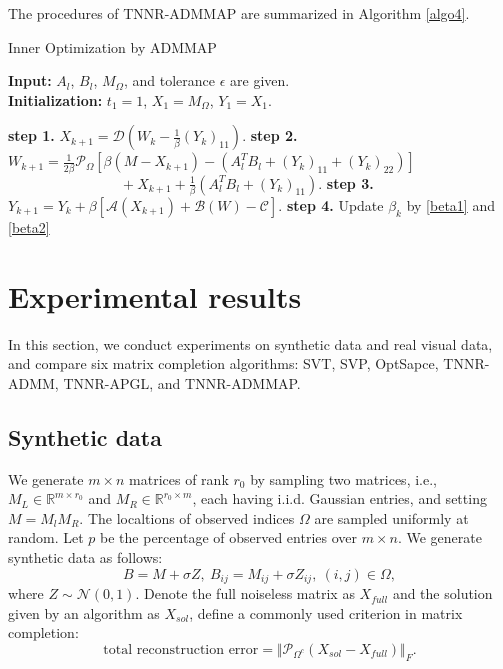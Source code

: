 \documentclass{article}
\begin{document}
{The procedures of TNNR-ADMMAP are summarized in Algorithm \ref{algo4}.

\begin{algorithm}[t]
	\caption{Inner Optimization by ADMMAP}
	\label{algo4}
	\textbf{Input:} $A_l$, $B_l$, $M_{\Omega}$, and tolerance $\epsilon$ are given.\\
	\textbf{Initialization:} $t_1 = 1$, $X_1 = M_{\Omega}$, $Y_1=X_1$.
	\begin{algorithmic}
		\Repeat 
		\State \textbf{step 1.} $X_{k+1} = \mathcal{D}\left(W_k - \frac{1}{\beta}(Y_k)_{11}\right)$.
		\State \textbf{step 2.} $W_{k+1} = \frac{1}{2\beta} \mathcal{P}_\Omega [\beta(M-X_{k+1}) - (A_l^TB_l + (Y_k)_{11}+ (Y_k)_{22})]$ \\
		$ \quad\quad\quad\quad\quad\quad\quad\quad+ X_{k+1} +  \frac{1}{\beta}(A_l^TB_l + (Y_k)_{11})$.
		\State \textbf{step 3.} $Y_{k+1} = Y_{k}+\beta[\mathcal{A}(X_{k+1})+\mathcal{B}(W)-\mathcal{C}]$.
		\State \textbf{step 4.} Update $\beta_k$ by \eqref{beta1} and \eqref{beta2}
	\end{algorithmic}
\end{algorithm}



\section{Experimental results}
\label{s4}

In this section, we conduct experiments on synthetic data and real visual data, and compare six matrix completion algorithms: SVT, SVP, OptSapce, TNNR-ADMM, TNNR-APGL, and TNNR-ADMMAP.

\subsection{Synthetic data}
We generate $m \times n$ matrices of rank $r_0$ by sampling two matrices, i.e., $M_L \in \mathbb{R}^{m \times r_0} $ and $M_R \in \mathbb{R}^{r_0 \times m} $, each having i.i.d. Gaussian entries, and setting $M=M_l M_R$. The localtions of observed indices $\Omega$ are sampled uniformly at random. Let $p$ be the  percentage of observed entries over $m \times n$. We generate synthetic data as follows:
\begin{equation*}
	B = M+ \sigma Z, \ B_{ij} = M_{ij} + \sigma Z_{ij}, \ (i,j) \in \Omega,
\end{equation*}
where $Z \sim \mathcal{N} (0,1)$. Denote the full noiseless matrix as $X_{full}$ and the solution given by an algorithm as $X_{sol}$, define a commonly used criterion in matrix completion:
\begin{equation*}
	\text{total reconstruction error} = \Vert \mathcal{P}_{\Omega^c}(X_{sol}-X_{full})\Vert_F.
\end{equation*}

}
\end{document}
